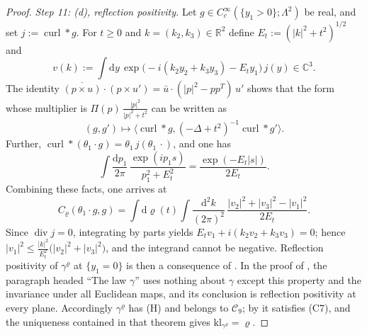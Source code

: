 \documentclass[11pt]{amsart}
\theoremstyle{definition}
\begin{document}
\begin{proof}
\emph{Step 11: (d), reflection positivity.}
Let $g\in C_c^\infty(\{y_1>0\};\Lambda^2)$ be real, and set $j:=\operatorname{curl}\ast g$.
For $t\ge0$ and $k=(k_2,k_3)\in\mathbb R^2$ define $E_t:=(|k|^2+t^2)^{1/2}$ and
\begin{equation*}
v(k):=\int\mathrm dy\,\exp\bigl(-i(k_2y_2+k_3y_3)-E_ty_1\bigr)\,j(y)\in\mathbb C^3.
\end{equation*}
The identity $\overline{(p\times u)}\cdot(p\times u')=\allowbreak \bar u\cdot(|p|^2-pp^T)\,\allowbreak u'$ shows that the form whose multiplier is $\Pi(p)\,\frac{|p|^2}{|p|^2+t^2}$ can be written as
\begin{equation*}
(g,g')\mapsto\bigl\langle\operatorname{curl}\ast g,(-\Delta+t^2)^{-1}\operatorname{curl}\ast g'\bigr\rangle.
\end{equation*}
Further, $\operatorname{curl}\ast(\theta_1\cdot g)=\allowbreak \theta_1\,\allowbreak j(\theta_1\,\allowbreak \cdot)$, and one has
\begin{equation*}
\int\frac{\mathrm dp_1}{2\pi}\,\frac{\exp(ip_1s)}{p_1^2+E_t^2}=\frac{\exp(-E_t|s|)}{2E_t}.
\end{equation*}
Combining these facts, one arrives at
\begin{equation*}
C_\varrho(\theta_1\cdot g,g)=\int\mathrm d\varrho(t)\int\frac{\mathrm d^2k}{(2\pi)^2}\,\frac{|v_2|^2+|v_3|^2-|v_1|^2}{2E_t}.
\end{equation*}
Since $\operatorname{div}j=0$, integrating by parts yields $E_tv_1+i(k_2v_2+k_3v_3)=0$; hence $|v_1|^2\le\frac{|k|^2}{E_t^2}\bigl(|v_2|^2+|v_3|^2\bigr)$, and the integrand cannot be negative.
Reflection positivity of $\gamma^\varrho$ at $\{y_1=0\}$ is then a consequence of \cite[Lemma~9.11\,(d)]{QEDI}.
In the proof of \cite[Lemma~12.29]{QEDII}, the paragraph headed ``The law $\gamma$'' uses nothing about $\gamma$ except this property and the invariance under all Euclidean maps, and its conclusion is reflection positivity at every plane.
Accordingly $\gamma^\varrho$ has (H) and belongs to $\mathcal C_9$; by \cite[Theorem~1.4, Part~I\,(d), (f)]{QEDII} it satisfies (C7), and the uniqueness contained in that theorem gives $\mathrm{kl}_{\gamma^\varrho}=\varrho$.


\end{proof}
\end{document}
